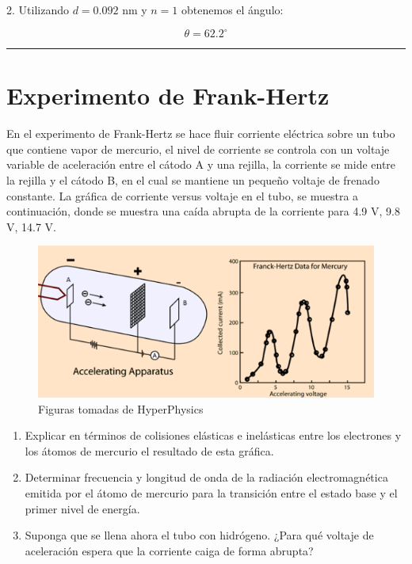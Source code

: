 \documentclass[12pt]{article}
\begin{document}
2. Utilizando $d=0.092$ nm y $n=1$ obtenemos el ángulo:

\begin{equation*}
\theta = 62.2^{\circ}
\end{equation*}

\noindent\rule{16.5cm}{0.4pt}

\section{Experimento de Frank-Hertz}

En el experimento de Frank-Hertz se hace fluir corriente eléctrica sobre un tubo que contiene
vapor de mercurio, el nivel de corriente se controla con un voltaje variable de aceleración entre el
cátodo A y una rejilla, la corriente se mide entre la rejilla y el cátodo B, en el cual se mantiene un
pequeño voltaje de frenado constante. La gráfica de corriente versus voltaje en el tubo, se muestra
a continuación, donde se muestra una caída abrupta de la corriente para 4.9 V, 9.8 V, 14.7 V.

	\begin{figure}[h!]
		\centering
	\includegraphics[scale=1, angle=0]{frank}
	\caption{Figuras tomadas de HyperPhysics}
\end{figure}

\begin{enumerate}
	\item Explicar en términos de colisiones elásticas e inelásticas entre los electrones y los átomos de
	mercurio el resultado de esta gráfica.
	\item  Determinar frecuencia y longitud de onda de la radiación electromagnética emitida por el átomo
	de mercurio para la transición entre el estado base y el primer nivel de energía.
	\item Suponga que se llena ahora el tubo con hidrógeno. ¿Para qué voltaje de aceleración espera que la
	corriente caiga de forma abrupta?
\end{enumerate}
\end{document}
